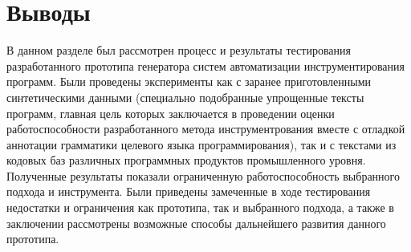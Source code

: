 \section{Выводы}

В данном разделе был рассмотрен процесс и результаты тестирования разработанного прототипа генератора систем автоматизации инструментирования программ.
Были проведены эксперименты как с заранее приготовленными синтетическими данными (специально подобранные упрощенные тексты программ, главная цель которых заключается в проведении оценки работоспособности разработанного метода инструментрования вместе с отладкой аннотации грамматики целевого языка программирования), так и с текстами из кодовых баз различных программных продуктов промышленного уровня.
Полученные результаты показали ограниченную работоспособность выбранного подхода и инструмента.
Были приведены замеченные в ходе тестирования недостатки и ограничения как прототипа, так и выбранного подхода, а также в заключении рассмотрены возможные способы дальнейшего развития данного прототипа.
